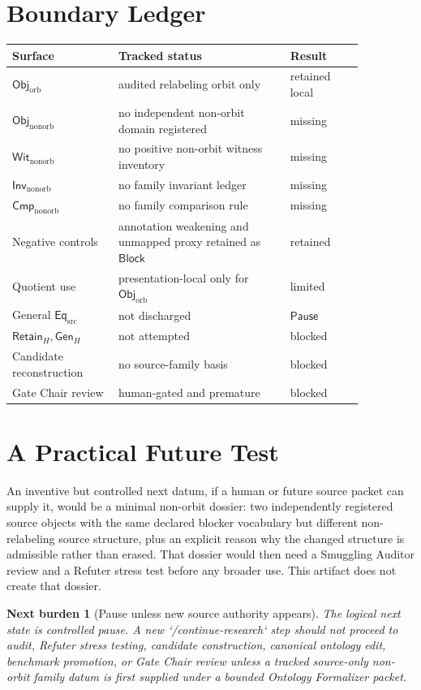 \documentclass[11pt]{article}
\newcommand{\ObjOrb}{\mathsf{Obj}_{\mathrm{orb}}}
\newcommand{\ObjNon}{\mathsf{Obj}_{\mathrm{nonorb}}}
\newcommand{\InvNon}{\mathsf{Inv}_{\mathrm{nonorb}}}
\newcommand{\CmpNon}{\mathsf{Cmp}_{\mathrm{nonorb}}}
\newcommand{\WitNon}{\mathsf{Wit}_{\mathrm{nonorb}}}
\newcommand{\EqSrc}{\mathsf{Eq}_{\mathrm{src}}}
\newcommand{\GenH}{\mathsf{Gen}_{H}}
\newcommand{\RetainH}{\mathsf{Retain}_{H}}
\newcommand{\Block}{\mathsf{Block}}
\newcommand{\Pause}{\mathsf{Pause}}
\newtheorem{nextburden}{Next burden}
\begin{document}
\section{Boundary Ledger}

\begin{center}
\begin{tabular}{p{0.26\linewidth}p{0.42\linewidth}p{0.18\linewidth}}
\textbf{Surface} & \textbf{Tracked status} & \textbf{Result} \\
\hline
\(\ObjOrb\) & audited relabeling orbit only & retained local \\
\(\ObjNon\) & no independent non-orbit domain registered & missing \\
\(\WitNon\) & no positive non-orbit witness inventory & missing \\
\(\InvNon\) & no family invariant ledger & missing \\
\(\CmpNon\) & no family comparison rule & missing \\
Negative controls & annotation weakening and unmapped proxy retained as \(\Block\) & retained \\
Quotient use & presentation-local only for \(\ObjOrb\) & limited \\
General \(\EqSrc\) & not discharged & \(\Pause\) \\
\(\RetainH,\GenH\) & not attempted & blocked \\
Candidate reconstruction & no source-family basis & blocked \\
Gate Chair review & human-gated and premature & blocked \\
\end{tabular}
\end{center}

\section{A Practical Future Test}

An inventive but controlled next datum, if a human or future source packet
can supply it, would be a minimal non-orbit dossier: two independently
registered source objects with the same declared blocker vocabulary but
different non-relabeling source structure, plus an explicit reason why the
changed structure is admissible rather than erased. That dossier would
then need a Smuggling Auditor review and a Refuter stress test before any
broader use. This artifact does not create that dossier.

\begin{nextburden}[Pause unless new source authority appears]
The logical next state is controlled pause. A new `/continue-research`
step should not proceed to audit, Refuter stress testing, candidate
construction, canonical ontology edit, benchmark promotion, or Gate Chair
review unless a tracked source-only non-orbit family datum is first
supplied under a bounded Ontology Formalizer packet.
\end{nextburden}
\end{document}
